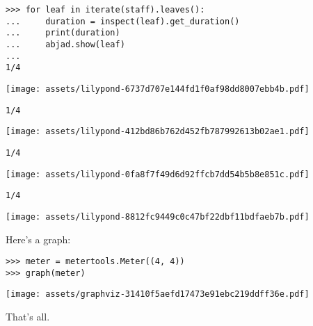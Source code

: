 \documentclass{article}
\begin{document}
\begin{lstlisting}
>>> for leaf in iterate(staff).leaves():
...     duration = inspect(leaf).get_duration()
...     print(duration)
...     abjad.show(leaf)
...
1/4
\end{lstlisting}
\noindent\texttt{[image: assets/lilypond-6737d707e144fd1f0af98dd8007ebb4b.pdf]}
\begin{lstlisting}
1/4
\end{lstlisting}
\noindent\texttt{[image: assets/lilypond-412bd86b762d452fb787992613b02ae1.pdf]}
\begin{lstlisting}
1/4
\end{lstlisting}
\noindent\texttt{[image: assets/lilypond-0fa8f7f49d6d92ffcb7dd54b5b8e851c.pdf]}
\begin{lstlisting}
1/4
\end{lstlisting}
\noindent\texttt{[image: assets/lilypond-8812fc9449c0c47bf22dbf11bdfaeb7b.pdf]}

Here's a graph:

\begin{comment}
<abjad>
meter = metertools.Meter((4, 4))
graph(meter)
</abjad>
\end{comment}

\begin{lstlisting}
>>> meter = metertools.Meter((4, 4))
>>> graph(meter)
\end{lstlisting}
\noindent\texttt{[image: assets/graphviz-31410f5aefd17473e91ebc219ddff36e.pdf]}

That's all.
\end{document}
